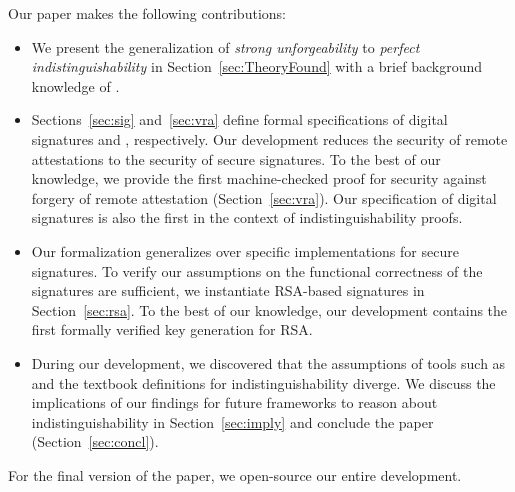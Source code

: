 %
Our paper makes the following contributions:
%
\begin{itemize}
  \item We present the generalization of \emph{strong
  unforgeability} to \emph{perfect indistinguishability} in Section~\ref{sec:TheoryFound} 
  with a brief background knowledge of \ssprove. 
  \item Sections~\ref{sec:sig} and~\ref{sec:vra} define formal 
        specifications of digital signatures and \ra, respectively.
    Our development reduces the security of remote
    attestations to the security of secure signatures.
    To the best of our knowledge, we provide the first
    machine-checked proof for security against forgery
    of remote attestation (Section~\ref{sec:vra}).
    Our specification of digital signatures is also
    the first in the context of indistinguishability
    proofs.
  \item Our formalization generalizes over specific
    implementations for secure signatures.
    To verify our assumptions on the functional correctness
    of the signatures are sufficient, we instantiate RSA-based
    signatures in Section~\ref{sec:rsa}.
    To the best of our knowledge, our development contains
    the first formally verified key generation for RSA.
  \item During our development, we discovered that the
    assumptions of tools such as \ssprove and the textbook
    definitions for indistinguishability diverge.
    We discuss the implications of our findings for future
    frameworks to reason about indistinguishability in
    Section~\ref{sec:imply} and conclude the paper
    (Section~\ref{sec:concl}). 
\end{itemize}


%
For the final version of the paper, we open-source our
entire \coq development.
%

